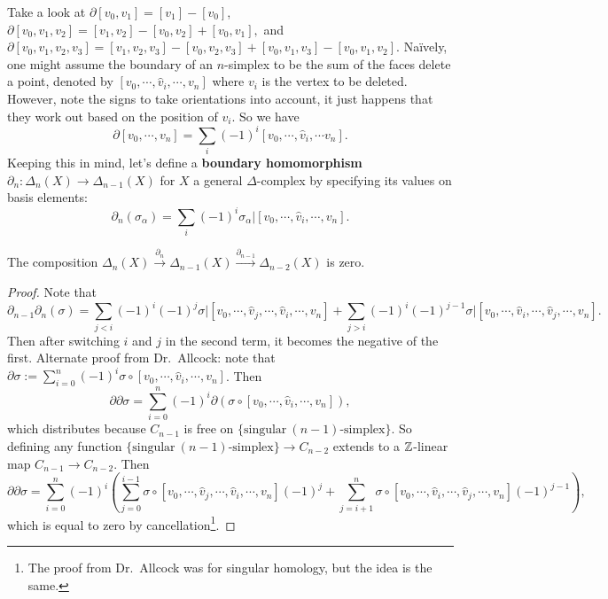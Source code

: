 Take a look at $\partial [v_0,v_1]=[v_1]-[v_0]$, $\partial [v_0,v_1,v_2]=[v_1,v_2]-[v_0,v_2]+[v_0,v_1],$ and $\partial [v_0,v_1, v_2,v_3]=[v_1,v_2,v_3]-[v_0,v_2,v_3]+[v_0,v_1,v_3]-[v_0,v_1,v_2]$. Na\"ively, one might assume the boundary of an $n$-simplex to be the sum of the faces delete a point, denoted by $[v_0,\cdots ,\hat{v}_i ,\cdots ,v_n] $ where $v_i $ is the vertex to be deleted. However, note the signs to take orientations into account, it just happens that they work out based on the position of $v_i $. So we have \[
    \partial [v_0,\cdots ,v_n ]=\sum_{i}^{} (-1)^i [v_0,\cdots ,\hat{v}_i ,\cdots v_n ].
\] Keeping this in mind, let's define a \textbf{boundary homomorphism} $\partial _n \colon \Delta _n (X) \to \Delta _{n-1}(X)$ for $X$ a general $\Delta $-complex by specifying its values on basis elements: 
\[
    \partial _n (\sigma_{\alpha })=\sum_{i}^{} (-1)^i \left. \sigma_{\alpha }\right| [v_0,\cdots ,\hat{v}_i ,\cdots ,v_n ].
\] 
\begin{lemma}
    The composition $\Delta _n (X) \overset{\partial _n }{\longrightarrow}\Delta _{n-1}(X)\overset{\partial _{n-1}}{\longrightarrow}\Delta _{n-2}(X)$ is zero.
\end{lemma}
\begin{proof}
    Note that \[
        \partial _{n-1}\partial _n (\sigma)=\sum_{j<i}^{} (-1)^i (-1)^{j}\left.\sigma\right|  [v_0,\cdots ,\hat{v}_j ,\cdots ,\hat{v}_i ,\cdots ,v_n ]+\sum_{j>i}^{} (-1)^i (-1)^{j-1}\left.\sigma\right|  [v_0,\cdots ,\hat{v}_i ,\cdots ,\hat{v}_{j},\cdots ,v_n ].
            \] Then after switching $i$ and $j$ in the second term, it becomes the negative of the first. Alternate proof from Dr.\ Allcock: note that $\partial \sigma:= \sum_{i=0}^{n} (-1)^i \sigma \circ[v_0,\cdots ,\hat{v}_i ,\cdots ,v_n ]$. Then \[
            \partial \partial \sigma = \sum_{i=0}^{n} (-1)^i \partial \left( \sigma\circ[v_0,\cdots ,\hat{v}_i ,\cdots ,v_n ] \right) ,
        \] which distributes because $C_{n-1}$ is free on $\{\text{singular}\ (n-1)\text{-simplex}\} $. So defining any function $\{\text{singular}\ (n-1)\text{-simplex}\} \to C _{n-2}$ extends to a $\mathbb{Z}$-linear map $C_{n-1}\to C_{n-2}$. Then \[
        \partial \partial \sigma = \sum_{i=0}^{n} (-1)^i \left( \sum_{j=0}^{i-1} \sigma \circ [v_0,\cdots ,\hat{v}_j,\cdots ,\hat{v}_i ,\cdots ,v_n ](-1)^{j}+\sum_{j=i+1}^{n} \sigma \circ [v_0,\cdots ,\hat{v}_i ,\cdots ,\hat{v}_j,\cdots ,v_n ](-1)^{j-1} \right) ,
        \] which is equal to zero by cancellation\footnote{The proof from Dr.\ Allcock was for singular homology, but the idea is the same.}.
\end{proof}

